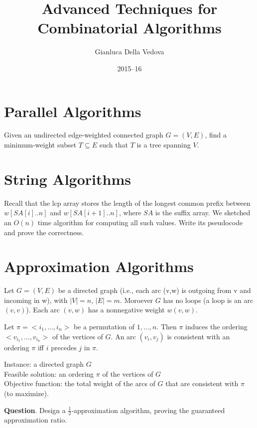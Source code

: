 \documentclass[12pt]{article}
\begin{document}
\title{Advanced Techniques for Combinatorial Algorithms}
\author{Gianluca Della Vedova}
\date{2015--16}

\maketitle


\section{Parallel Algorithms}

Given an undirected edge-weighted connected graph $G = (V, E)$, find a minimum-weight
subset $T \subseteq E$ such that $T$ is a tree spanning $V$.

\section{String Algorithms}

Recall that the lcp array stores the length of the longest common
prefix between $w[SA[i]..n]$ and $w[SA[i+1]..n]$, where $SA$ is the suffix
array. We sketched an $O(n)$ time algorithm for computing all such
values. Write its pseudocode and prove the correctness.

\section{Approximation Algorithms}


Let $G=(V,E)$ be a directed graph (i.e., each arc (v,w) is outgoing from
v and incoming in w), with $|V|=n$, $|E|=m$.
Moroever $G$ has no loops (a loop is an arc $(v,v)$).
Each arc $(v,w)$ has a nonnegative weight $w(v,w)$.

Let $\pi=<i_1, \ldots, i_n>$ be a permutation of $1, \ldots, n$. Then
$\pi$ induces the ordering $<v_{i_1}, \ldots, v_{i_n}>$ of the vertices of $G$.
An arc $(v_i, v_j)$ is consistent with an ordering $\pi$ iff $i$
precedes $j$ in $\pi$.

Instance: a directed graph $G$\\
Feasible solution: an ordering $\pi$ of the vertices of $G$\\
Objective function: the total weight of the arcs of $G$ that are consistent with
$\pi$ (to maximize).


\textbf{Question}.
Design a $\frac{1}{2}$-approximation algorithm, proving the guaranteed
approximation ratio.
\end{document}
